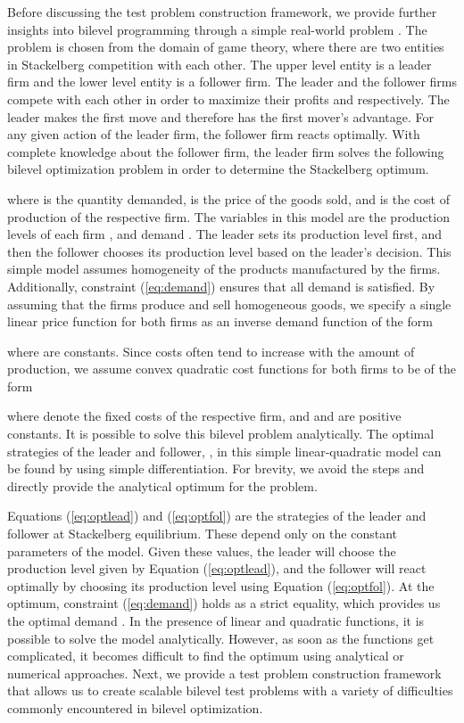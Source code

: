 \documentclass[twoside]{article}
\begin{document}
Before discussing the test problem construction framework, we provide further insights into bilevel programming through a simple real-world problem \citep{my-caor13,my-ifac12}. The problem is chosen from the domain of game theory, where there are two entities in Stackelberg competition with each other. The upper level entity is a leader firm and the lower level entity is a follower firm. The leader and the follower firms compete with each other in order to maximize their profits  and  respectively. The leader makes the first move and therefore has the first mover's advantage. For any given action of the leader firm, the follower firm reacts optimally. 
With complete knowledge about the follower firm, the leader firm solves the following bilevel optimization problem in order to determine the Stackelberg optimum.

where  is the quantity demanded,  is the price of the goods sold, and  is the cost of production of the respective firm. The variables in this model are the production levels of each firm ,  and demand . The leader sets its production level first, and then the follower chooses its production level based on the leader's decision. This simple model assumes homogeneity of the products manufactured by the firms. Additionally, constraint (\ref{eq:demand}) ensures that all demand is satisfied.
By assuming that the firms produce and sell homogeneous goods, we specify a single linear price function for both firms as an inverse demand function of the form

where  are constants. Since costs often tend to increase with the amount of production, we assume convex quadratic cost functions for both firms to be of the form

where  denote the fixed costs of the respective firm, and  and  are positive constants. It is possible to solve this bilevel problem analytically. The optimal strategies of the leader and follower, , in this simple linear-quadratic model can be found by using simple differentiation. For brevity, we avoid the steps and directly provide the analytical optimum for the problem.


Equations (\ref{eq:optlead}) and (\ref{eq:optfol}) are the strategies of the leader and follower at Stackelberg equilibrium. These depend only on the constant parameters of the model. Given these values, the leader will choose the production level given by Equation (\ref{eq:optlead}), and the follower will react optimally by choosing its production level using Equation (\ref{eq:optfol}). At the optimum, constraint (\ref{eq:demand}) holds as a strict equality, which provides us the optimal demand . In the presence of linear and quadratic functions, it is possible to solve the model analytically. However, as soon as the functions get complicated, it becomes difficult to find the optimum using analytical or numerical approaches. Next, we provide a test problem construction framework that allows us to create scalable bilevel test problems with a variety of difficulties commonly encountered in bilevel optimization.
\end{document}
